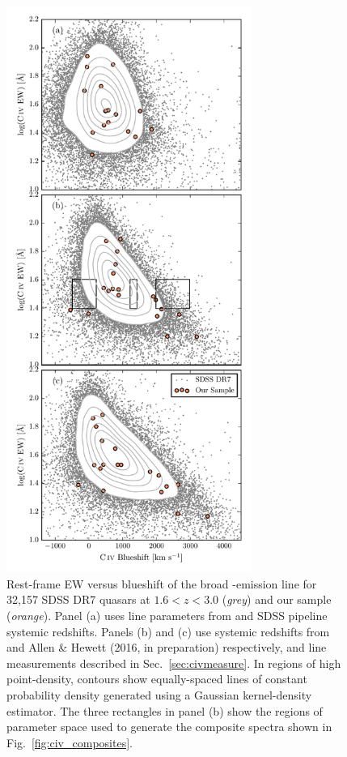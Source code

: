 \begin{figure}
    \includegraphics[width=8cm]{figures/chapter02/civ_space.pdf}
    \caption{Rest-frame EW versus blueshift of the broad -emission line for 32,157 SDSS DR7 quasars at $1.6 < z < 3.0$ ({\it grey}) and our sample ({\it orange}). Panel (a) uses  line parameters from \citet{shen11} and SDSS pipeline systemic redshifts. Panels (b) and (c) use systemic redshifts from \citet{hewett10} and Allen \& Hewett (2016, in preparation) respectively, and  line measurements described in Sec.~\ref{sec:civmeasure}. In regions of high point-density, contours show equally-spaced lines of constant probability density generated using a Gaussian kernel-density estimator. The three rectangles in panel (b) show the regions of parameter space used to generate the composite spectra shown in Fig.~\ref{fig:civ_composites}. } 
    \label{fig:civ_space}
\end{figure}

